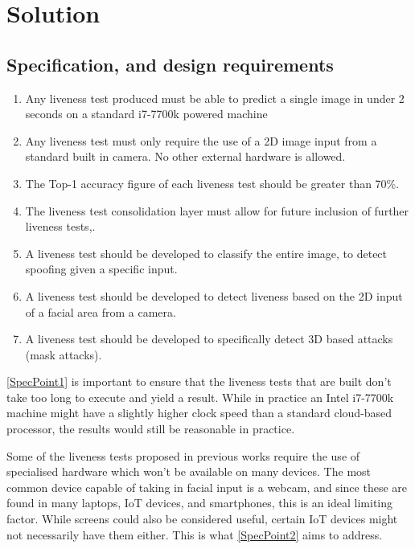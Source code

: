 \documentclass[10pt,a4paper]{article}
\begin{document}
\section{Solution}
    \subsection{Specification, and design requirements}
        \begin{enumerate}
            \item \label{SpecPoint1} Any liveness test produced must be able to predict a single image in under 2 seconds on a standard i7-7700k powered machine
            \item \label{SpecPoint2} Any liveness test must only require the use of a 2D image input from a standard built in camera. No other external hardware is allowed.
            \item \label{SpecPoint3} The Top-1 accuracy figure of each liveness test should be greater than 70\%.
            \item \label{SpecPoint4} The liveness test consolidation layer must allow for future inclusion of further liveness tests,.
            \item \label{SpecPoint5} A liveness test should be developed to classify the entire image, to detect spoofing given a specific input.
            \item \label{SpecPoint6} A liveness test should be developed to detect liveness based on the 2D input of a facial area from a camera.
            \item \label{SpecPoint7} A liveness test should be developed to specifically detect 3D based attacks (mask attacks).
        \end{enumerate}

        \ref{SpecPoint1} is important to ensure that the liveness tests that are built don't take too long to execute and yield a result. While in practice an Intel i7-7700k machine might have a
        slightly higher clock speed than a standard cloud-based processor, the results would still be reasonable in practice.

        Some of the liveness tests proposed in previous works require the use of specialised hardware which won't be available on many devices. The most common device capable of taking in facial input is a
        webcam, and since these are found in many laptops, IoT devices, and smartphones, this is an ideal limiting factor. While screens could also be considered useful, certain IoT devices might not necessarily have them either.
        This is what \ref{SpecPoint2} aims to address.
\end{document}
